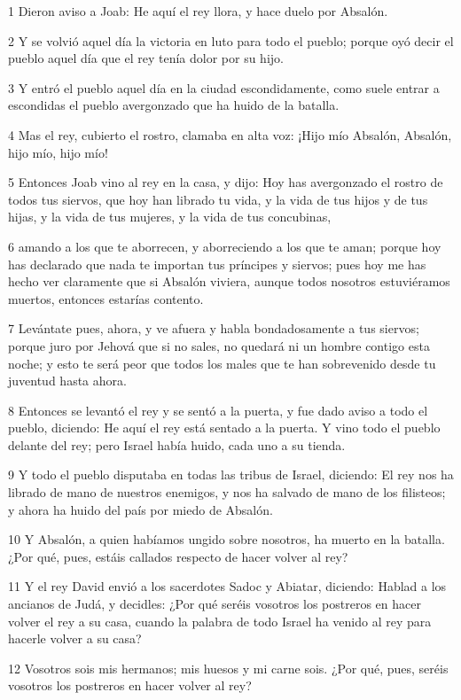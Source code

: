 \par 1 Dieron aviso a Joab: He aquí el rey llora, y hace duelo por Absalón.
\par 2 Y se volvió aquel día la victoria en luto para todo el pueblo; porque oyó decir el pueblo aquel día que el rey tenía dolor por su hijo.
\par 3 Y entró el pueblo aquel día en la ciudad escondidamente, como suele entrar a escondidas el pueblo avergonzado que ha huido de la batalla.
\par 4 Mas el rey, cubierto el rostro, clamaba en alta voz: ¡Hijo mío Absalón, Absalón, hijo mío, hijo mío!
\par 5 Entonces Joab vino al rey en la casa, y dijo: Hoy has avergonzado el rostro de todos tus siervos, que hoy han librado tu vida, y la vida de tus hijos y de tus hijas, y la vida de tus mujeres, y la vida de tus concubinas,
\par 6 amando a los que te aborrecen, y aborreciendo a los que te aman; porque hoy has declarado que nada te importan tus príncipes y siervos; pues hoy me has hecho ver claramente que si Absalón viviera, aunque todos nosotros estuviéramos muertos, entonces estarías contento.
\par 7 Levántate pues, ahora, y ve afuera y habla bondadosamente a tus siervos; porque juro por Jehová que si no sales, no quedará ni un hombre contigo esta noche; y esto te será peor que todos los males que te han sobrevenido desde tu juventud hasta ahora.
\par 8 Entonces se levantó el rey y se sentó a la puerta, y fue dado aviso a todo el pueblo, diciendo: He aquí el rey está sentado a la puerta. Y vino todo el pueblo delante del rey; pero Israel había huido, cada uno a su tienda.
\par 9 Y todo el pueblo disputaba en todas las tribus de Israel, diciendo: El rey nos ha librado de mano de nuestros enemigos, y nos ha salvado de mano de los filisteos; y ahora ha huido del país por miedo de Absalón.
\par 10 Y Absalón, a quien habíamos ungido sobre nosotros, ha muerto en la batalla. ¿Por qué, pues, estáis callados respecto de hacer volver al rey? 
\par 11 Y el rey David envió a los sacerdotes Sadoc y Abiatar, diciendo: Hablad a los ancianos de Judá, y decidles: ¿Por qué seréis vosotros los postreros en hacer volver el rey a su casa, cuando la palabra de todo Israel ha venido al rey para hacerle volver a su casa?
\par 12 Vosotros sois mis hermanos; mis huesos y mi carne sois. ¿Por qué, pues, seréis vosotros los postreros en hacer volver al rey?
